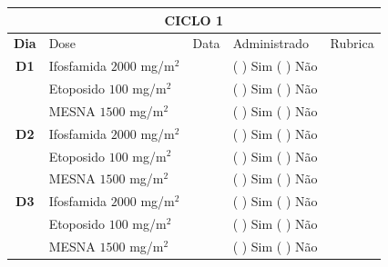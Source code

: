\documentclass[11pt,a4paper,oldfontcommands]{memoir}
\begin{document}
\begin{center}
\begin{table}[H]
\begin{tabular}{p{1cm}p{5cm}|p{1.4cm}|p{3cm}|p{3cm}}
	\hline
	\multicolumn{5}{c}{\textbf{CICLO 1}}\\
\hline
    \multicolumn{1}{c|}{\multirow{1}{*}{\textbf{Dia}}}&{Dose}&{Data}&{Administrado}&{Rubrica} \\
    \hline
    \multicolumn{1}{c|}{\multirow{1}{*}{\textbf{D1}}}&{Ifosfamida \(2000\) mg/m\(^2\)}&&{(  ) Sim (  ) Não}&\\
    \multicolumn{1}{c|}{\multirow{1}{*}{\textbf{}}}&{Etoposido \(100\) mg/m\(^2\)}&&{(  ) Sim (  ) Não}&\\
    \multicolumn{1}{c|}{\multirow{1}{*}{\textbf{}}}&{MESNA \(1500\) mg/m\(^2\)}&&{(  ) Sim (  ) Não}&\\
    \multicolumn{1}{c|}{\multirow{1}{*}{\textbf{D2}}}&{Ifosfamida \(2000\) mg/m\(^2\)}&&{(  ) Sim (  ) Não}&\\
    \multicolumn{1}{c|}{\multirow{1}{*}{\textbf{}}}&{Etoposido \(100\) mg/m\(^2\)}&&{(  ) Sim (  ) Não}&\\
    \multicolumn{1}{c|}{\multirow{1}{*}{\textbf{}}}&{MESNA \(1500\) mg/m\(^2\)}&&{(  ) Sim (  ) Não}&\\
    \multicolumn{1}{c|}{\multirow{1}{*}{\textbf{D3}}}&{Ifosfamida \(2000\) mg/m\(^2\)}&&{(  ) Sim (  ) Não}&\\
    \multicolumn{1}{c|}{\multirow{1}{*}{\textbf{}}}&{Etoposido \(100\) mg/m\(^2\)}&&{(  ) Sim (  ) Não}&\\
    \multicolumn{1}{c|}{\multirow{1}{*}{\textbf{}}}&{MESNA \(1500\) mg/m\(^2\)}&&{(  ) Sim (  ) Não}&\\


\end{tabular}
\end{table}
\end{center}
\end{document}
